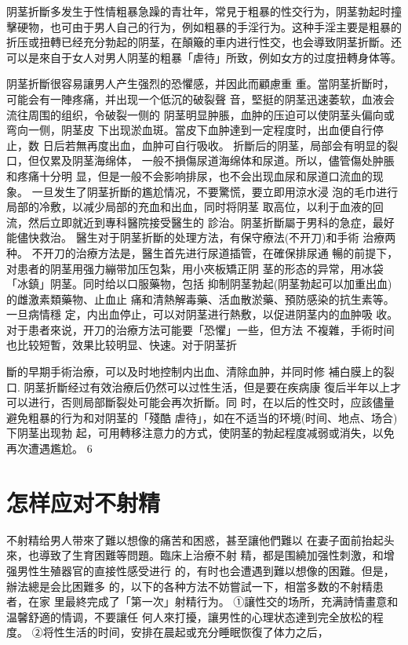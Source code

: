 \documentclass[12pt,UTF8]{ctexbook}
\begin{document}
阴茎折斷多发生于性情粗暴急躁的青壮年，常見于粗暴的性交行为，阴茎勃起时撞擊硬物，也可由于男人自己的行为，例如粗暴的手淫行为。这种手淫主要是粗暴的折压或扭轉已经充分勃起的阴茎，在顛簸的車内进行性交，也会導致阴茎折斷。还可以是來自于女人对男人阴茎的粗暴「虐待」所致，例如女方的过度扭轉身体等。

阴茎折斷很容易讓男人产生强烈的恐懼感，并因此而顧慮重
重。當阴茎折斷时，可能会有一陣疼痛，并出现一个低沉的破裂聲
音，堅挺的阴茎迅速萎软，血液会流往周围的组织，令破裂一侧的
阴茎明显肿脹，血肿的压迫可以使阴茎头偏向或弯向一侧，阴茎皮
下出现淤血斑。當皮下血肿達到一定程度时，出血便自行停止，数
日后若無再度出血，血肿可自行吸收。
折斷后的阴茎，局部会有明显的裂口，但仅累及阴茎海绵体，
一般不損傷尿道海绵体和尿道。所以，儘管傷处肿脹和疼痛十分明
显，但是一般不会影响排尿，也不会出现血尿和尿道口流血的现
象。
一旦发生了阴茎折斷的尷尬情况，不要驚慌，要立即用涼水浸
泡的毛巾进行局部的冷敷，以减少局部的充血和出血，同时将阴茎
取高位，以利于血液的回流，然后立即就近到專科醫院接受醫生的
診治。阴茎折斷屬于男科的急症，最好能儘快救治。
醫生对于阴茎折斷的处理方法，有保守療法(不开刀)和手術
治療两种。
不开刀的治療方法是，醫生首先进行尿道插管，在確保排尿通
暢的前提下，对患者的阴茎用强力繃带加压包紮，用小夾板矯正阴
茎的形态的异常，用冰袋「冰鎮」阴茎。同时给以口服藥物，包括
抑制阴茎勃起(阴茎勃起可以加重出血)的雌激素類藥物、止血止
痛和清熱解毒藥、活血散淤藥、預防感染的抗生素等。一旦病情穩
定，内出血停止，可以对阴茎进行熱敷，以促进阴茎内的血肿吸
收。
对于患者來说，开刀的治療方法可能要「恐懼」一些，但方法
不複雜，手術时间也比较短暫，效果比较明显、快速。对于阴茎折

斷的早期手術治療，可以及时地控制内出血、清除血肿，并同时修
補白膜上的裂口.
阴茎折斷经过有效治療后仍然可以过性生活，但是要在疾病康
復后半年以上才可以进行，否则局部斷裂处可能会再次折斷。同
时，在以后的性交时，应該儘量避免粗暴的行为和对阴茎的「殘酷
虐待」，如在不适当的环境(时间、地点、场合)下阴茎出现勃
起，可用轉移注意力的方式，使阴茎的勃起程度减弱或消失，以免
再次遭遇尷尬。
6
\section{怎样应对不射精}
不射精给男人带來了難以想像的痛苦和困惑，甚至讓他們難以
在妻子面前抬起头來，也導致了生育困難等問題。臨床上治療不射
精，都是围繞加强性刺激，和增强男性生殖器官的直接性感受进行
的，有时也会遭遇到難以想像的困難。但是，辦法總是会比困難多
的，以下的各种方法不妨嘗試一下，相當多数的不射精患者，在家
里最終完成了「第一次」射精行为。
①讓性交的场所，充满詩情畫意和温馨舒適的情调，不要讓任
何人來打擾，讓男性的心理状态達到完全放松的程度。
②将性生活的时间，安排在晨起或充分睡眠恢復了体力之后，
\end{document}
